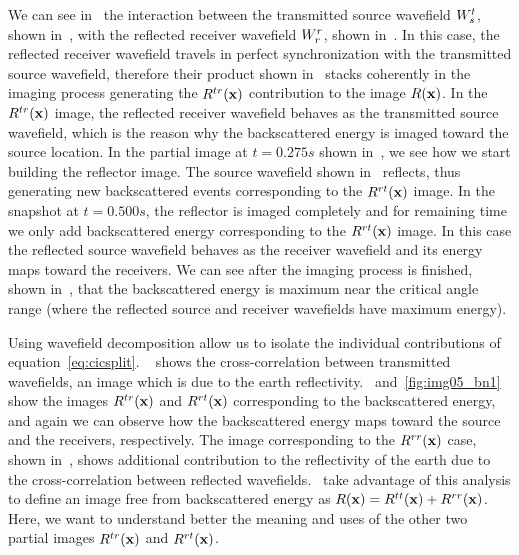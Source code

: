 We can see in~ the interaction between the transmitted source wavefield ${W_s^t}$, shown in~, with 
the reflected receiver wavefield ${W_r^r}$, shown in~. In this case, the reflected receiver wavefield travels in perfect synchronization
with the transmitted source wavefield, therefore their product shown in~ stacks coherently in the imaging 
process generating the $R^{tr}({\bf x})$ contribution to the image $R({\bf x})$. In the $R^{tr}({\bf x})$ image, the reflected 
receiver wavefield behaves as the transmitted source wavefield, which is the reason why the backscattered energy is imaged toward the source location. 
%
%
 In the partial image at $t=0.275s$ shown in~, we see how we start building the reflector image.
 The source wavefield shown in~ reflects, thus generating new backscattered events
corresponding to the  $R^{rt}({\bf x})$ image.
%
%
In the snapshot at $t=0.500s$, the reflector is imaged completely and 
 for remaining time we only add backscattered energy corresponding to the $R^{rt}({\bf x})$ image. In this case the 
reflected source wavefield behaves as the receiver wavefield and its energy maps toward the receivers. We can see after
 the imaging process is finished, shown in~, that the backscattered energy is maximum near the critical
 angle range (where the reflected source and receiver wavefields have maximum energy).

Using wavefield decomposition allow us to isolate the individual contributions of equation~\ref{eq:cicsplit}. 
~ shows the cross-correlation between transmitted wavefields, an image which is due to the
earth reflectivity.~ and~\ref{fig:img05_bn1} show the images $R^{tr}({\bf x})$ and $R^{rt}({\bf x})$ corresponding
to the backscattered energy, and again we can observe how the backscattered energy
maps toward the source and the receivers, respectively. The image corresponding to the $R^{rr}({\bf x})$ case, shown 
in~, shows additional contribution to the reflectivity of the earth due to the cross-correlation
between reflected wavefields.~\cite{fei:3130} take  advantage of this analysis to define an image 
free from backscattered energy as $R({\bf x})=R^{tt}({\bf x})+R^{rr}({\bf x})$. Here,
we want to understand better the meaning and uses of the other two partial images $R^{tr}({\bf x})$ and $R^{rt}({\bf x})$.



